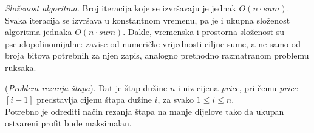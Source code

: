 \textit{Složenost algoritma}. Broj iteracija koje se izvršavaju je jednak $O(n \cdot sum)$. Svaka iteracija se izvršava u konstantnom vremenu, pa je i ukupna složenost algoritma jednaka  $O(n \cdot sum)$. Dakle, vremenska i prostorna složenost su pseudopolinomijalne: zavise od numeričke vrijednosti ciljne sume, a ne samo od broja bitova potrebnih za njen zapis, analogno prethodno razmatranom problemu ruksaka. 

\begin{example}
	(\textit{Problem rezanja štapa}). Dat je štap dužine $n$ i niz cijena \textit{price}, pri čemu \textit{price}$[i-1]$ predstavlja cijenu štapa dužine $i$, za svako $1 \leq i \leq n$.\\ 
	
	Potrebno je odrediti način rezanja štapa na manje dijelove tako da ukupan ostvareni profit bude maksimalan.
	
\end{example}


